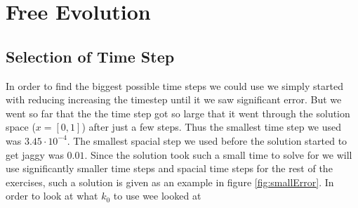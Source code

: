 \documentclass[11pt]{article}
\begin{document}
\section{Free Evolution}
\subsection{Selection of Time Step}
In order to find the biggest possible time steps we could use we simply started with reducing increasing the timestep until it we saw significant error. But we went so far that the the time step got so large that it went through the solution space ($x=[0,1]$) after just a few steps. Thus the smallest time step we used was  $3.45\cdot 10^{-4}$. The smallest spacial step we used before the solution started to get jaggy was $0.01$. Since the solution took such a small time to solve for we will use significantly smaller time steps and spacial time steps for the rest of the exercises, such a solution is given as an example in figure \ref{fig:smallError}. In order to look at what $k_0$ to use wee looked at
\end{document}
